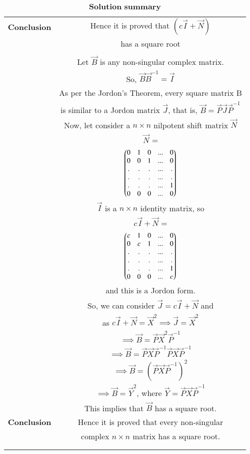 \begin{longtable}{|c|c|}
& \\
\hline
\textbf{Conclusion} & Hence it is proved that $(c\vec{I}+\vec{N})$\\
& has a square root\\
\hline
\multirow{3}{*}{} & \\
\textbf{Proof 2} & Let $\vec{B}$ is any non-singular complex matrix.\\
& So, $\vec{B}\vec{B}^{-1}= \vec{I}$\\
& As per the Jordon's Theorem, every square matrix B\\
&  is similar to a Jordon matrix $\vec{J}$, that is, $\vec{B}=\vec{P}\vec{J}\vec{P}^{-1}$\\
& Now, let consider a $n \times n$ nilpotent shift matrix $\vec{N}$\\
& $\vec{N}$ = \\
& $\begin{pmatrix}0 & 1 &0 &...& 0\\0 & 0 & 1& ...& 0\\.&.&.&...&.\\.&.&.&...&.\\.&.&.&...&1\\0 & 0 &0 &...& 0\end{pmatrix}$\\
& $\vec{I}$ is a $n \times n$ identity matrix, so \\
& $c\vec{I}+\vec{N}$ = \\
& $\begin{pmatrix}c & 1 &0 &...& 0\\0 & c & 1& ...& 0\\.&.&.&...&.\\.&.&.&...&.\\.&.&.&...&1\\0 & 0 &0 &...& c\end{pmatrix}$\\
& and this is a Jordon form.\\
& So, we can consider $\vec{J} = c\vec{I}+\vec{N}$ and \\
& as $c\vec{I}+\vec{N}= \vec{X}^2 \implies \vec{J}=\vec{X}^2$ \\
& $\implies \vec{B}=\vec{P}\vec{X}^2\vec{P}^{-1}$\\
& $\implies \vec{B}=\vec{P}\vec{X}\vec{P}^{-1}\vec{P}\vec{X}\vec{P}^{-1}$\\
& $\implies \vec{B}=(\vec{P}\vec{X}\vec{P}^{-1})^2$\\
& $\implies \vec{B}=\vec{Y}^2$, where $\vec{Y} = \vec{P}\vec{X}\vec{P}^{-1}$\\
& This implies that $\vec{B}$ has a square root.\\
\hline
\textbf{Conclusion} & Hence it is proved that every non-singular \\
& complex $n \times n$ matrix has a square root.\\
& \\
\hline
\caption{$\textbf{Solution summary}$}
\label{eq:solutions/7/3/16/table:1}
\end{longtable}
\twocolumn
